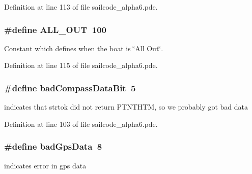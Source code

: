 \-Definition at line 113 of file sailcode\-\_\-alpha6.\-pde.

\hypertarget{group__globalconstants_ga074485974be5a03e711020873d83fd90}{
\subsubsection[{\-A\-L\-L\-\_\-\-O\-U\-T}]{\setlength{\rightskip}{0pt plus 5cm}\#define \-A\-L\-L\-\_\-\-O\-U\-T~100}}
\label{group__globalconstants_ga074485974be5a03e711020873d83fd90}


\-Constant which defines when the boat is \char`\"{}\-All Out\char`\"{}. 



\-Definition at line 115 of file sailcode\-\_\-alpha6.\-pde.

\hypertarget{group__globalconstants_ga69c4923d7bb43a1880f9fbb878bed927}{
\subsubsection[{bad\-Compass\-Data\-Bit}]{\setlength{\rightskip}{0pt plus 5cm}\#define bad\-Compass\-Data\-Bit~5}}
\label{group__globalconstants_ga69c4923d7bb43a1880f9fbb878bed927}


indicates that strtok did not return \-P\-T\-N\-T\-H\-T\-M, so we probably got bad data 



\-Definition at line 103 of file sailcode\-\_\-alpha6.\-pde.

\hypertarget{group__globalconstants_ga5219c41d9ae91432ffb55ec7aeef8873}{
\subsubsection[{bad\-Gps\-Data}]{\setlength{\rightskip}{0pt plus 5cm}\#define bad\-Gps\-Data~8}}
\label{group__globalconstants_ga5219c41d9ae91432ffb55ec7aeef8873}


indicates error in gps data 



